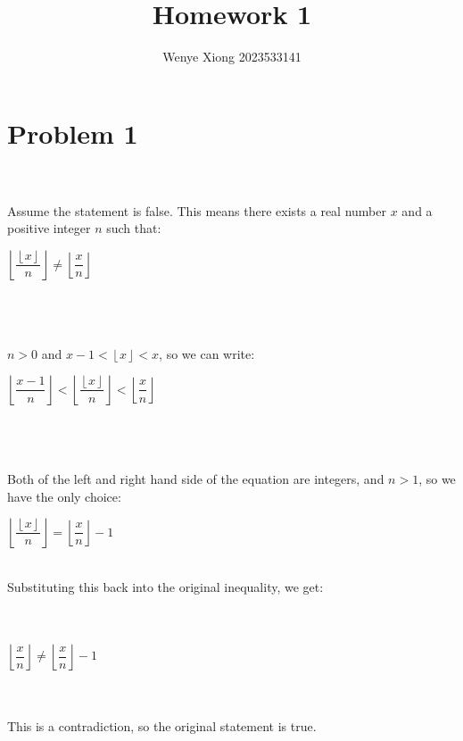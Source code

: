 \documentclass{article}
\author{Wenye Xiong 2023533141}
\title{Homework 1}
\begin{document}
\maketitle

\section{Problem 1}
\\ \hspace*{\fill} \\
Assume the statement is false. This means there exists a real number $ x $ and a positive integer $ n $ such that:\\

\centerline{$\left\lfloor\dfrac{\left\lfloor{x}\right\rfloor}{n}\right\rfloor \neq \left\lfloor\dfrac{x}{n}\right\rfloor$}\\
\\ \hspace*{\fill} \\

$n>0$ and $ x-1 < \left\lfloor{x}\right\rfloor < x$, so we can write:\\

\centerline{$\left\lfloor\dfrac{x-1}{n}\right\rfloor < \left\lfloor\dfrac{\left\lfloor{x}\right\rfloor}{n}\right\rfloor < \left\lfloor\dfrac{x}{n}\right\rfloor$ } \\

\\ \hspace*{\fill} \\
Both of the left and right hand side of the equation are integers, and $n>1$, so we have the only choice:\\

\centerline{$\left\lfloor\dfrac{\left\lfloor{x}\right\rfloor}{n}\right\rfloor = \left\lfloor\dfrac{x}{n}\right\rfloor-1$}\\

Substituting this back into the original inequality, we get:\\
\\ \hspace*{\fill} \\
\centerline{$\left\lfloor\dfrac{x}{n}\right\rfloor \neq \left\lfloor\dfrac{x}{n}\right\rfloor-1$}
\\ \hspace*{\fill} \\
This is a contradiction, so the original statement is true.\\
\end{document}
